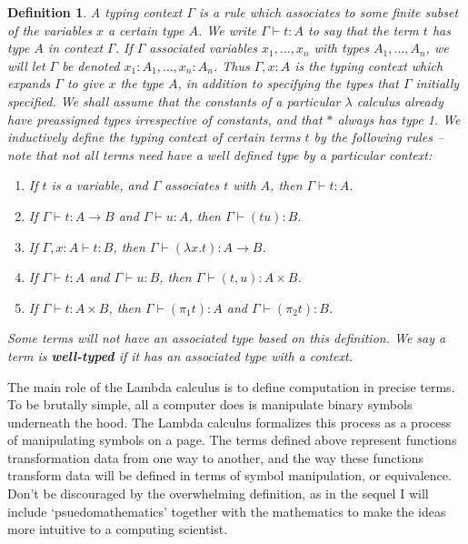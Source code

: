 \documentclass{article}
\theoremstyle{plain}
\newtheorem{definition}{Definition}
\begin{document}
\begin{definition}
    A typing context $\Gamma$ is a rule which associates to some finite subset of the variables $x$ a certain type $A$. We write $\Gamma \vdash t : A$ to say that the term $t$ has type $A$ in context $\Gamma$. If $\Gamma$ associated variables $x_1, \dots, x_n$ with types $A_1, \dots, A_n$, we will let $\Gamma$ be denoted $x_1:A_1, \dots, x_n:A_n$. Thus $\Gamma, x:A$ is the typing context which expands $\Gamma$ to give $x$ the type $A$, in addition to specifying the types that $\Gamma$ initially specified. We shall assume that the constants of a particular $\lambda$ calculus already have preassigned types irrespective of constants, and that $*$ always has type 1. We inductively define the typing context of certain terms $t$ by the following rules -- note that not all terms need have a well defined type by a particular context:
    \begin{enumerate}
        \item If $t$ is a variable, and $\Gamma$ associates $t$ with $A$, then $\Gamma \vdash t : A$.
        \item If $\Gamma \vdash t : A \rightarrow B$ and $\Gamma \vdash u : A$, then $\Gamma \vdash (tu) : B$.
        \item If $\Gamma, x : A \vdash t : B$, then $\Gamma \vdash (\lambda x.t) : A \to B$.
        \item If $\Gamma \vdash t: A$ and $\Gamma \vdash u : B$, then $\Gamma \vdash (t,u): A \times B$.
        \item If $\Gamma \vdash t: A \times B$, then $\Gamma \vdash (\pi_1 t) : A$ and $\Gamma \vdash (\pi_2 t) : B$.
    \end{enumerate}
    Some terms will not have an associated type based on this definition. We say a term is {\bf well-typed} if it has an associated type with a context.
\end{definition}

The main role of the Lambda calculus is to define computation in precise terms. To be brutally simple, all a computer does is manipulate binary symbols underneath the hood. The Lambda calculus formalizes this process as a process of manipulating symbols on a page. The terms defined above represent functions transformation data from one way to another, and the way these functions transform data will be defined in terms of symbol manipulation, or equivalence. Don't be discouraged by the overwhelming definition, as in the sequel I will include `psuedomathematics' together with the mathematics to make the ideas more intuitive to a computing scientist.
\end{document}
